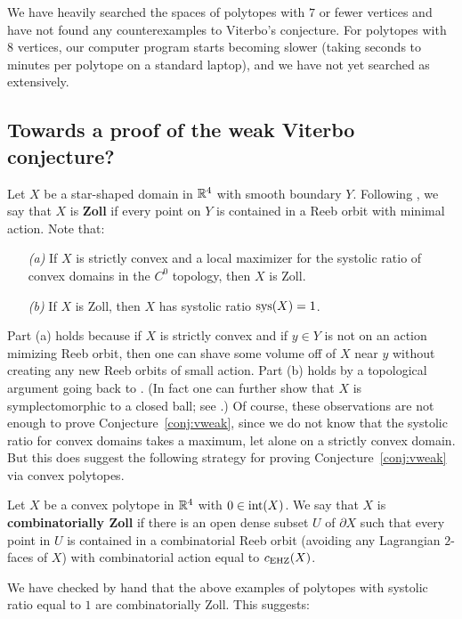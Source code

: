 We have heavily searched the spaces of polytopes with $7$ or fewer vertices and have not found any counterexamples to Viterbo's conjecture. For polytopes with $8$ vertices, our computer program starts becoming slower (taking seconds to minutes per polytope on a standard laptop), and we have not yet searched as extensively.

\subsection*{Towards a proof of the weak Viterbo conjecture?}
Let $X$ be a star-shaped domain in ${\mathbb R}^4$ with smooth boundary $Y$. Following \cite{abhs}, we say that $X$ is {\bf Zoll\/} if every point on $Y$ is contained in a Reeb orbit with minimal action. Note that:
\begin{itemize}
	\item[\emph{(a)}] If $X$ is strictly convex and a local maximizer for the systolic ratio of convex domains in the $C^0$ topology, then $X$ is Zoll.
	\item[\emph{(b)}] If $X$ is Zoll, then $X$ has systolic ratio $\operatorname{sys}(X)=1$.
\end{itemize}
Part (a) holds because if $X$ is strictly convex and if $y\in Y$ is not on an action mimizing Reeb orbit, then one can shave some volume off of $X$ near $y$ without creating any new Reeb orbits of small action. Part (b) holds by a topological argument going back to \cite{weinstein}. (In fact one can further show that $X$ is symplectomorphic to a closed ball; see \cite[Prop.\ 4.3]{abhs}.) Of course, these observations are not enough to prove Conjecture~\ref{conj:vweak}, since we do not know that the systolic ratio for convex domains takes a maximum, let alone on a strictly convex domain. But this does suggest the following strategy for proving Conjecture~\ref{conj:vweak} via convex polytopes.

\begin{definition}
\label{def:combinatorially_Zoll}
Let $X$ be a convex polytope in ${\mathbb R}^4$ with $0\in\operatorname{int}(X)$. We say that $X$ is {\bf combinatorially Zoll\/} if there is an open dense subset $U$ of $\partial X$ such that every point in $U$ is contained in a combinatorial Reeb orbit (avoiding any Lagrangian $2$-faces of $X$) with combinatorial action equal to $c_{\operatorname{EHZ}}(X)$.
\end{definition}

We have checked by hand that the above examples of polytopes with systolic ratio equal to $1$ are combinatorially Zoll. This suggests:

